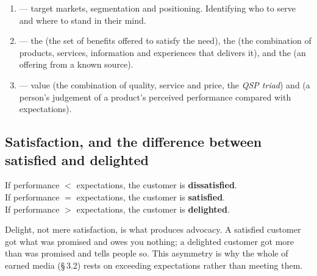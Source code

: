 \documentclass{MMTextbook}
\begin{document}
\begin{enumerate}
\item {} --- target markets, segmentation and positioning.
      Identifying who to serve and where to stand in their mind.
\item {} --- the  (the set of
      benefits offered to satisfy the need), the  (the
      combination of products, services, information and experiences that
      delivers it), and the  (an offering from a known source).
\item {} --- value (the combination of quality, service and
      price, the \emph{QSP triad}) and  (a person's
      judgement of a product's perceived performance compared with
      expectations).
\end{enumerate}

\subsection{Satisfaction, and the difference between satisfied and delighted}

\begin{keybox}
If performance $<$ expectations, the customer is \textbf{dissatisfied}.\\
If performance $=$ expectations, the customer is \textbf{satisfied}.\\
If performance $>$ expectations, the customer is \textbf{delighted}.

\smallskip
Delight, not mere satisfaction, is what produces advocacy. A satisfied customer
got what was promised and owes you nothing; a delighted customer got more than
was promised and tells people so. This asymmetry is why the whole of earned
media (\S\,3.2) rests on exceeding expectations rather than meeting them.
\end{keybox}
\end{document}
